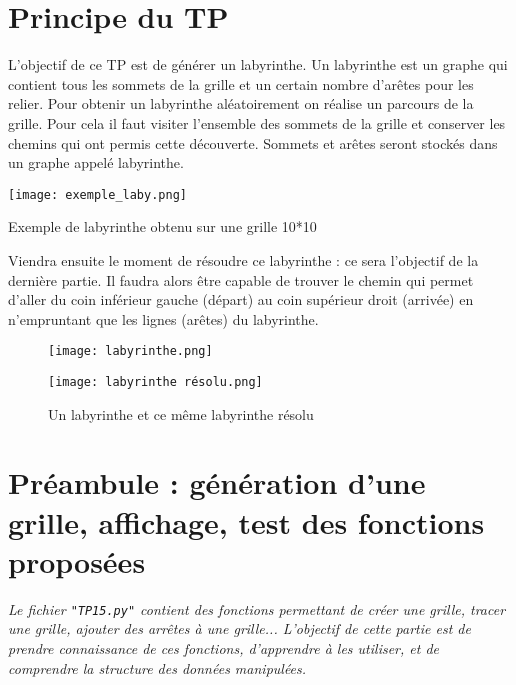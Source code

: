\section{Principe du TP}
L'objectif de ce TP est de générer un labyrinthe. Un labyrinthe est un graphe qui contient tous les sommets de la grille et un certain nombre d'arêtes pour les relier.
Pour obtenir un labyrinthe aléatoirement on réalise un parcours de la grille.
Pour cela il faut visiter l'ensemble des sommets de la grille et conserver les chemins qui ont permis cette découverte. Sommets et arêtes seront stockés dans un graphe appelé labyrinthe.

\begin{marginfigure}
\texttt{[image: exemple\_laby.png]}
\caption{Exemple de labyrinthe obtenu sur une grille 10*10}
\end{marginfigure}


Viendra ensuite le moment de résoudre ce labyrinthe : ce sera l'objectif de la dernière partie. Il faudra alors être capable de trouver le chemin qui permet d'aller du coin inférieur gauche (départ) au coin supérieur droit (arrivée) en n'empruntant que les lignes (arêtes) du labyrinthe. 

	
\begin{figure}[!h]\centering
	\begin{minipage}{.4\textwidth}
	\texttt{[image: labyrinthe.png]}
	\end{minipage}
\hspace{0.5 cm}	
	\begin{minipage}{.4\textwidth}
	
		\texttt{[image: labyrinthe résolu.png]}
		
	\end{minipage}
\caption{Un labyrinthe et ce même labyrinthe résolu}
\end{figure}


\section{Préambule : génération d'une grille, affichage, test des fonctions proposées}

\textit{Le fichier \texttt{"TP15.py"}  contient des fonctions permettant de créer une grille, tracer une grille, ajouter des arrêtes à une grille... L'objectif de cette partie est de prendre connaissance de ces fonctions, d'apprendre à les utiliser, et de comprendre la structure des données manipulées.}\\


